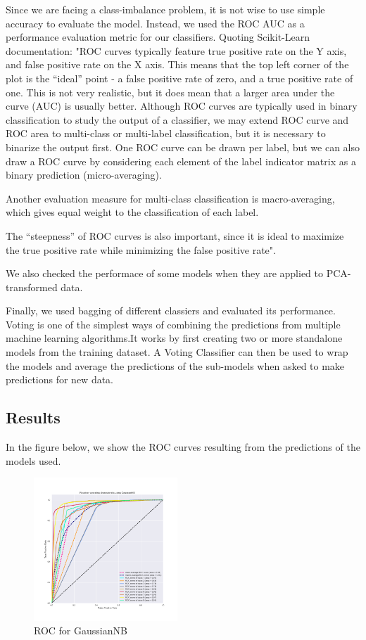 \documentclass[a4paper,english,12pt, twocolumn]{article}
\begin{document}
Since we are facing a class-imbalance problem, it is not wise to use simple accuracy to evaluate the model. Instead, we used the ROC AUC as a performance evaluation metric for our classifiers. Quoting Scikit-Learn documentation: "ROC curves typically feature true positive rate on the Y axis, and false positive rate on the X axis. This means that the top left corner of the plot is the “ideal” point - a false positive rate of zero, and a true positive rate of one. This is not very realistic, but it does mean that a larger area under the curve (AUC) is usually better. Although ROC curves are typically used in binary classification to study the output of a classifier, we may extend ROC curve and ROC area to multi-class or multi-label classification, but it is necessary to binarize the output first. One ROC curve can be drawn per label, but we can also draw a ROC curve by considering each element of the label indicator matrix as a binary prediction (micro-averaging).

Another evaluation measure for multi-class classification is macro-averaging, which gives equal weight to the classification of each label.

The “steepness” of ROC curves is also important, since it is ideal to maximize the true positive rate while minimizing the false positive rate".

We also checked the performace of some models when they are applied to PCA-transformed data. 

Finally, we used bagging of different classiers and evaluated its performance. Voting is one of the simplest ways of combining the predictions from multiple machine learning algorithms.It works by first creating two or more standalone models from the training dataset. A Voting Classifier can then be used to wrap the models and average the predictions of the sub-models when asked to make predictions for new data.

\subsection{Results}
In the figure below, we show the ROC curves resulting from the predictions of the models used. 

\begin{figure}[H]
	\centering
	\includegraphics[width=0.48\textwidth,keepaspectratio]{ROC_OvR_GaussianNB}
	\caption{ROC for GaussianNB}
\end{figure}
\end{document}

